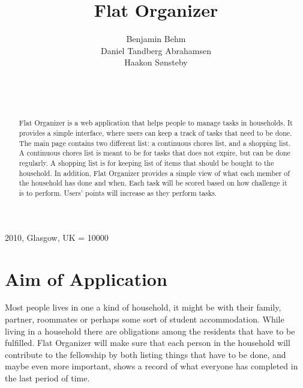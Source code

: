 \documentclass{sig-alt-release2}
\begin{document}
\newcommand{\todo}[1]{\textcolor{red}{#1}}
\def\newblock{\hskip .11em plus .33em minus .07em}

 {2010, Glasgow, UK} 
\widowpenalty = 10000

\title{{Flat Organizer}}

\author{
\alignauthor
Benjamin Behm\\
Daniel Tandberg Abrahamsen\\
Haakon S{\o}nsteby\\
	   \\
      \\
      \\
}
\maketitle

\begin{abstract}
Flat Organizer is a web application that helps people to manage tasks in households. It provides a simple interface, where users can keep a track of tasks that need to be done. The main page contains two different list: a continuous chores list, and a shopping list. A continuous chores list is meant to be for tasks that does not expire, but can be done regularly. A shopping list is for keeping list of items that should be bought to the household. In addition, Flat Organizer provides a simple view of what each member of the household has done and when. Each task will be scored based on how challenge it is to perform. Users’ points will increase as they perform tasks.

\end{abstract}

\section{Aim of Application}
Most people lives in one a kind of household, it might be with their family, partner, roommates or perhaps some sort of student accommodation. While living in a household there are obligations among the residents that have to be fulfilled. Flat Organizer will make sure that each person in the household will contribute to the fellowship by both listing things that have to be done, and maybe even more important, shows a record of what everyone has completed in the last period of time.
\end{document}
